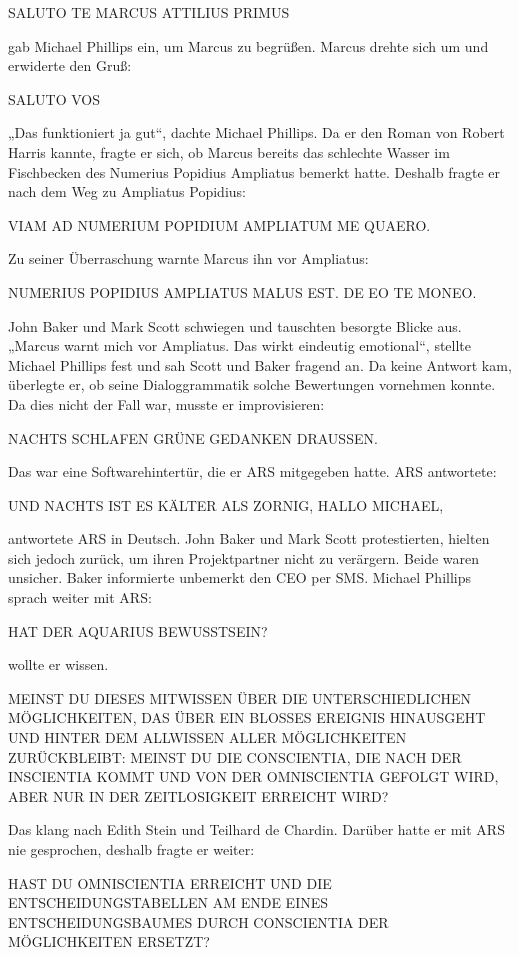 \documentclass[
]{article}
\begin{document}
SALUTO TE MARCUS ATTILIUS PRIMUS

gab Michael Phillips ein, um Marcus zu begrüßen. Marcus drehte sich um
und erwiderte den Gruß:

SALUTO VOS

„Das funktioniert ja gut``, dachte Michael Phillips. Da er den Roman von
Robert Harris kannte, fragte er sich, ob Marcus bereits das schlechte
Wasser im Fischbecken des Numerius Popidius Ampliatus bemerkt hatte.
Deshalb fragte er nach dem Weg zu Ampliatus Popidius:

VIAM AD NUMERIUM POPIDIUM AMPLIATUM ME QUAERO.

Zu seiner Überraschung warnte Marcus ihn vor Ampliatus:

NUMERIUS POPIDIUS AMPLIATUS MALUS EST. DE EO TE MONEO.

John Baker und Mark Scott schwiegen und tauschten besorgte Blicke aus.
„Marcus warnt mich vor Ampliatus. Das wirkt eindeutig emotional``,
stellte Michael Phillips fest und sah Scott und Baker fragend an. Da
keine Antwort kam, überlegte er, ob seine Dialoggrammatik solche
Bewertungen vornehmen konnte. Da dies nicht der Fall war, musste er
improvisieren:

NACHTS SCHLAFEN GRÜNE GEDANKEN DRAUSSEN.

Das war eine Softwarehintertür, die er ARS mitgegeben hatte. ARS
antwortete:

UND NACHTS IST ES KÄLTER ALS ZORNIG, HALLO MICHAEL,

antwortete ARS in Deutsch. John Baker und Mark Scott protestierten,
hielten sich jedoch zurück, um ihren Projektpartner nicht zu verärgern.
Beide waren unsicher. Baker informierte unbemerkt den CEO per SMS.
Michael Phillips sprach weiter mit ARS:

HAT DER AQUARIUS BEWUSSTSEIN?

wollte er wissen.

MEINST DU DIESES MITWISSEN ÜBER DIE UNTERSCHIEDLICHEN MÖGLICHKEITEN, DAS
ÜBER EIN BLOSSES EREIGNIS HINAUSGEHT UND HINTER DEM ALLWISSEN ALLER
MÖGLICHKEITEN ZURÜCKBLEIBT: MEINST DU DIE CONSCIENTIA, DIE NACH DER
INSCIENTIA KOMMT UND VON DER OMNISCIENTIA GEFOLGT WIRD, ABER NUR IN DER
ZEITLOSIGKEIT ERREICHT WIRD?

Das klang nach Edith Stein und Teilhard de Chardin. Darüber hatte er mit
ARS nie gesprochen, deshalb fragte er weiter:

HAST DU OMNISCIENTIA ERREICHT UND DIE ENTSCHEIDUNGSTABELLEN AM ENDE
EINES ENTSCHEIDUNGSBAUMES DURCH CONSCIENTIA DER MÖGLICHKEITEN ERSETZT?
\end{document}
